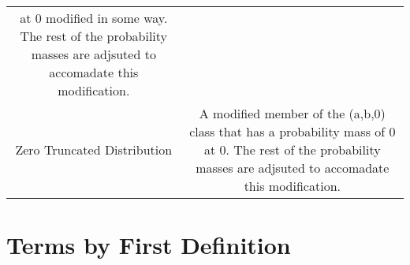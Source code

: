 \documentclass[]{book}
\theoremstyle{definition}
\theoremstyle{definition}
\theoremstyle{definition}
\theoremstyle{remark}
\begin{document}
\begin{longtable}[]{@{}cc@{}}
\begin{minipage}[t]{0.43\columnwidth}
at 0 modified in some way. The rest of the probability masses are
adjsuted to accomadate this modification.\strut
\end{minipage}\tabularnewline
\begin{minipage}[t]{0.43\columnwidth}\centering\strut
Zero Truncated Distribution\strut
\end{minipage} & \begin{minipage}[t]{0.43\columnwidth}\centering\strut
A modified member of the (a,b,0) class that has a probability mass of 0
at 0. The rest of the probability masses are adjsuted to accomadate this
modification.\strut
\end{minipage}\tabularnewline
\bottomrule
\end{longtable}

\chapter{Terms by First Definition}\label{terms-by-first-definition}
\end{document}
